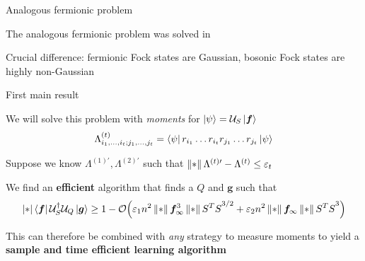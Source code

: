 \begin{frame}{Analogous fermionic problem}
  \begin{spaceditemize}[2em]
    \item The analogous fermionic problem was solved in \cite{aaronson2023efficient-tomog}
    \item Crucial difference: fermionic Fock states are Gaussian, bosonic Fock states are highly non-Gaussian
  \end{spaceditemize}
\end{frame}





\begin{frame}{First main result}
  \begin{spaceditemize}
    \item We will solve this problem with \textit{moments} for \( \ket\psi = \calU_S\ket{\bm f}\)
    \begin{equation*}
      \Lambda^{(t)}_{i_1,\dots,i_t; j_1,\dots,j_t} = \bra\psi r_{i_1}\dots r_{i_t} r_{j_1}\dots r_{j_t}\ket\psi
    \end{equation*}
    \item Suppose we know \(\Lambda^{(1)\prime},\Lambda^{(2)\prime}\) such that \(\left\lVert * \right\rVert{\Lambda^{(t)\prime} - \Lambda^{(t)}} \leq \varepsilon_t\)
    \pause
  \end{spaceditemize}

  \begin{theorem}
    We find an \textbf{efficient} algorithm that finds a \(Q\) and \(\bm g\) such that
    \begin{equation*}
      \abs*{\bra{\bm f}\calU_S^\dag \calU_Q \ket{\bm g}} \geq 1 - \bigO{\varepsilon_1 n^2 \norm*{\bm f}_\infty^3 \norm*{S^TS}^{3/2} + \varepsilon_2 n^2 \norm*{\bm f}_\infty \norm*{S^TS}^3}
    \end{equation*}
  \end{theorem}

  This can therefore be combined with \textit{any} strategy to measure moments to yield a \textbf{sample and time efficient learning algorithm}
\end{frame}


